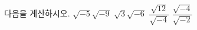 다음을 계산하시오.
 $\sqrt{-5}\sqrt{-9}$
 $\sqrt{3}\sqrt{-6}$
 $\dfrac{\sqrt{12}}{\sqrt{-4}}$
 $\dfrac{\sqrt{-4}}{\sqrt{-2}}$
